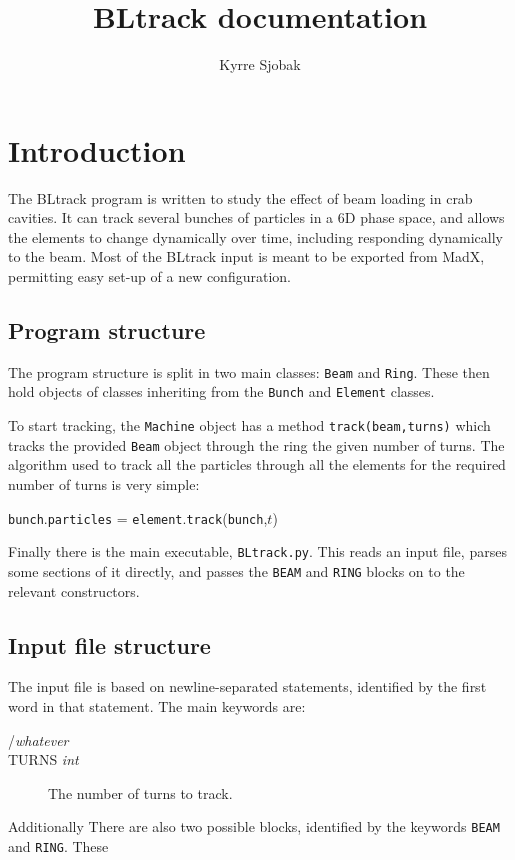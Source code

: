 \documentclass[a4paper]{report}
\title{BLtrack documentation}
\author{Kyrre Sjobak}
\begin{document}
\maketitle
\newpage
\tableofcontents

\chapter{Introduction}

The BLtrack program is written to study the effect of beam loading in crab cavities.
It can track several bunches of particles in a 6D phase space, and allows the elements to change dynamically over time, including responding dynamically to the beam.
Most of the BLtrack input is meant to be exported from MadX, permitting easy set-up of a new configuration.

\section{Program structure}
The program structure is split in two main classes: \texttt{Beam} and \texttt{Ring}.
These then hold objects of classes inheriting from the \texttt{Bunch} and \texttt{Element} classes.

To start tracking, the \texttt{Machine} object has a method \texttt{track(beam,turns)} which tracks the provided \texttt{Beam} object through the ring the given number of turns.
The algorithm used to track all the particles through all the elements for the required number of turns is very simple:
\begin{algorithmic}
        \STATE \texttt{bunch}.\texttt{particles} = \texttt{element}.\texttt{track}(\texttt{bunch},$t$)
      \ENDFOR
    \ENDFOR
  \ENDFOR
\end{algorithmic}

Finally there is the main executable, \texttt{BLtrack.py}.
This reads an input file, parses some sections of it directly, and passes the \texttt{BEAM} and \texttt{RING} blocks on to the relevant constructors.

\section{Input file structure}
The input file is based on newline-separated statements, identified by the first word in that statement.
The main keywords are:
\begin{description}
\item[/\textit{whatever}] 
\item[TURNS \textit{int}] The number of turns to track.
\end{description}
Additionally There are also two possible blocks, identified by the keywords \texttt{BEAM} and \texttt{RING}.
These 
\end{document}
